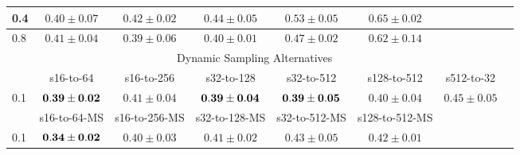 \documentclass[10pt,journal,compsoc]{IEEEtran}
\begin{document}
\begin{table*}[!htbp]
\begin{center}
{\begin{tabular}{|l|c|c|c|c|c|c|c|}
\hline
0.4   & $0.40\pm0.07$ & $0.42\pm0.02$ & $0.44\pm0.05$ & $0.53\pm0.05$ & $0.65\pm0.02$ &  \\
\hline
0.8   & $0.41\pm0.04$ & $0.39\pm0.06$ & $0.40\pm0.01$ & $0.47\pm0.02$ & $0.62\pm0.14$ &  \\
\hline
\multicolumn{7}{|c|}{Dynamic Sampling Alternatives}\\
\hline
& s16-to-64 & s16-to-256  & s32-to-128 & s32-to-512 & s128-to-512 & s512-to-32 \\
\hline
0.1  & $\bf 0.39\pm0.02$ & $0.41\pm0.04$ & $\bf 0.39\pm0.04$ &  $\bf 0.39\pm0.05$ & $0.40\pm0.04$ & $0.45\pm0.05$ \\
\hline
& s16-to-64-MS & s16-to-256-MS & s32-to-128-MS & s32-to-512-MS & s128-to-512-MS & \\
\hline
0.1  & $\bf 0.34\pm0.02$ & $0.40\pm0.03$ & $0.41\pm0.02$ & $0.43\pm0.05$ & $0.42\pm0.01$ & \\
\hline
\end{tabular}}
\end{center}
\end{table*}
\end{document}
